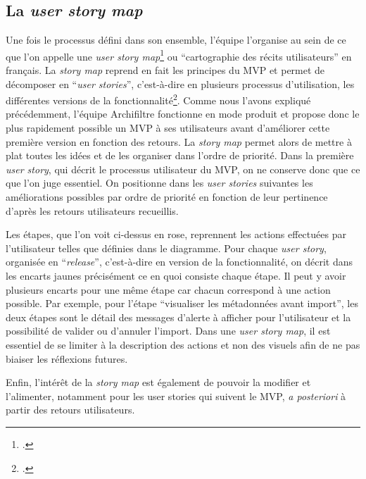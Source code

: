 \subsection{La \textit{user story map}}

Une fois le processus défini dans son ensemble, l’équipe l’organise au sein de ce que l’on appelle une \textit{user \gls{story map}}\footcite{miro_modeuser_nodate} ou \enquote{cartographie des récits utilisateurs} en français. La \textit{\gls{story map}} reprend en fait les principes du \gls{MVP} et permet de décomposer en \enquote{\textit{user stories}}, c'est-à-dire en plusieurs processus d’utilisation, les différentes versions de la fonctionnalité\footcite{kaley_mapping_2021}. Comme nous l’avons expliqué précédemment, l’équipe \gls{Archifiltre} fonctionne en mode produit et propose donc le plus rapidement possible un \gls{MVP} à ses utilisateurs avant d’améliorer cette première version en fonction des retours. La \textit{\gls{story map}} permet alors de mettre à plat toutes les idées et de les organiser dans l’ordre de priorité. Dans la première \textit{user story}, qui décrit le processus utilisateur du \gls{MVP}, on ne conserve donc que ce que l’on juge essentiel. On positionne dans les \textit{user stories} suivantes les améliorations possibles par ordre de priorité en fonction de leur pertinence d’après les retours utilisateurs recueillis.


Les étapes, que l’on voit ci-dessus en rose, reprennent les actions effectuées par l’utilisateur telles que définies dans le diagramme. Pour chaque \textit{user story}, organisée en \enquote{\textit{release}}, c’est-à-dire en version de la fonctionnalité, on décrit dans les encarts jaunes précisément ce en quoi consiste chaque étape. Il peut y avoir plusieurs encarts pour une même étape car chacun correspond à une action possible. Par exemple, pour l’étape \enquote{visualiser les métadonnées avant import}, les deux étapes sont le détail des messages d’alerte à afficher pour l’utilisateur et la possibilité de valider ou d’annuler l’import. Dans une \textit{user \gls{story map}}, il est essentiel de se limiter à la description des actions et non des visuels afin de ne pas biaiser les réflexions futures.


Enfin, l’intérêt de la \textit{\gls{story map}} est également de pouvoir la modifier et l’alimenter, notamment pour les user stories qui suivent le \gls{MVP}, \textit{a posteriori} à partir des retours utilisateurs.
 
